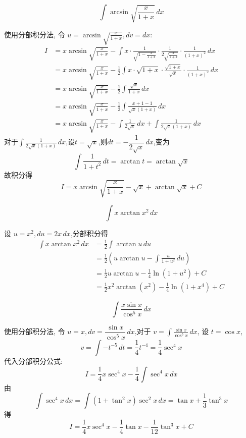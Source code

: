 \begin{questions}
    \question
    \[ 
    \int \arcsin \sqrt{\frac{x}{1+x}} \,dx 
    \]
    \begin{solution}
        使用分部积分法, 令 $u = \arcsin \sqrt{\frac{x}{1+x}}, dv = dx$:
        \begin{align*}
        I &= x \arcsin \sqrt{\frac{x}{1+x}} - \int x \cdot \frac{1}{\sqrt{1 - \frac{x}{1+x}}} \cdot \frac{1}{2\sqrt{\frac{x}{1+x}}} \cdot \frac{1}{(1+x)^2} \,dx \\
        &= x \arcsin \sqrt{\frac{x}{1+x}} - \frac{1}{2} \int x \cdot \sqrt{1+x} \cdot \frac{\sqrt{1+x}}{\sqrt{x}} \cdot \frac{1}{(1+x)^2} \,dx \\
        &= x \arcsin \sqrt{\frac{x}{1+x}} - \frac{1}{2} \int \frac{\sqrt{x}}{1+x} \,dx \\
        &= x \arcsin \sqrt{\frac{x}{1+x}} - \frac{1}{2} \int \frac{x+1-1}{\sqrt{x}(1+x)} \,dx \\
        &= x \arcsin \sqrt{\frac{x}{1+x}} - \int \frac{1}{2\sqrt{x}} \,dx + \int \frac{1}{2\sqrt{x}(1+x)} \,dx  
        \end{align*}
        对于$\displaystyle \int \frac{1}{2\sqrt{x}(1+x)} \,dx$,设$t=\sqrt{x}$,则$dt=-\dfrac{1}{2\sqrt{x}}\, dx$,变为
        \[
        \int \frac{1}{1+t^2} \,dt = \arctan t = \arctan\sqrt{x}
        \]
        故积分得
        \[ 
        I = x \arcsin \sqrt{\frac{x}{1+x}} - \sqrt{x} + \arctan\sqrt{x} + C 
        \]
    \end{solution}

    \question
    \[
    \int x \arctan x^2 \,dx
    \]
    \begin{solution}
        设 $u = x^2, du = 2x \,dx$,分部积分得
        \begin{align*}
        \int x \arctan x^2 \,dx &= \frac{1}{2} \int \arctan u \,du \\
        &= \frac{1}{2} \left( u \arctan u - \int \frac{u}{1+u^2} \,du \right) \\
        &= \frac{1}{2} u \arctan u - \frac{1}{4} \ln(1+u^2) + C \\
        &= \frac{1}{2} x^2 \arctan (x^2) - \frac{1}{4} \ln(1+x^4) + C
        \end{align*}
    \end{solution}

    \question
    \[ 
    \int \frac{x \sin x}{\cos^5 x} \,dx 
    \]
    \begin{solution}
        使用分部积分法, 令 $u = x, dv = \dfrac{\sin x}{\cos^5 x} \,dx$,对于 $\displaystyle v = \int \frac{\sin x}{\cos^5 x} \,dx$, 设 $t = \cos x$,
        \[ 
        v = \int -t^{-5} \,dt = \frac{1}{4} t^{-4} = \frac{1}{4} \sec^4 x 
        \]
        代入分部积分公式:
        \[ 
        I = \frac{1}{4}x \sec^4 x - \frac{1}{4} \int \sec^4 x \,dx 
        \]
        由 
        \[
        \int \sec^4 x \,dx = \int (1 + \tan^2 x) \sec^2 x \,dx = \tan x + \frac{1}{3} \tan^3 x
        \]
        得
        \[ 
        I = \frac{1}{4}x \sec^4 x - \frac{1}{4} \tan x - \frac{1}{12} \tan^3 x + C 
        \]
    \end{solution}


\end{questions}

